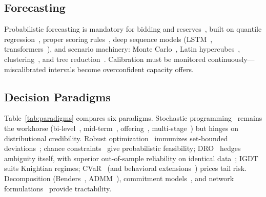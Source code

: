 \documentclass[journal]{IEEEtran}
\begin{document}
\subsection{Forecasting}
Probabilistic forecasting is mandatory for bidding and reserves~\cite{hong2016,pinson2013}, built on quantile regression~\cite{koenker1978}, proper scoring rules~\cite{gneiting2007}, deep sequence models (LSTM~\cite{hochreiter1997}, transformers~\cite{vaswani2017}), and scenario machinery: Monte Carlo~\cite{metropolis1949}, Latin hypercubes~\cite{mckay1979}, clustering~\cite{macqueen1967}, and tree reduction~\cite{groewe2003}. Calibration must be monitored continuously---miscalibrated intervals become overconfident capacity offers.

\subsection{Decision Paradigms}
Table~\ref{tab:paradigms} compares six paradigms. Stochastic programming~\cite{birge2011,conejo2010,morales2014} remains the workhorse (bi-level~\cite{kardakos2016}, mid-term~\cite{pandzic2013a}, offering~\cite{pandzic2013b}, multi-stage~\cite{wozabal2020,silva2022}) but hinges on distributional credibility. Robust optimization~\cite{bertsimas2004,bental2009} immunizes set-bounded deviations~\cite{rahimiyan2016,baringo2017}; chance constraints~\cite{charnes1959} give probabilistic feasibility; DRO~\cite{esfahani2018} hedges ambiguity itself, with superior out-of-sample reliability on identical data~\cite{liudro2022}; IGDT~\cite{benhaim2006} suits Knightian regimes; CVaR~\cite{rockafellar2000} (and behavioral extensions~\cite{kahneman1979}) prices tail risk. Decomposition (Benders~\cite{benders1962}, ADMM~\cite{boyd2011}), commitment models~\cite{padhy2004}, and network formulations~\cite{baran1989,stott2009} provide tractability.
\end{document}
